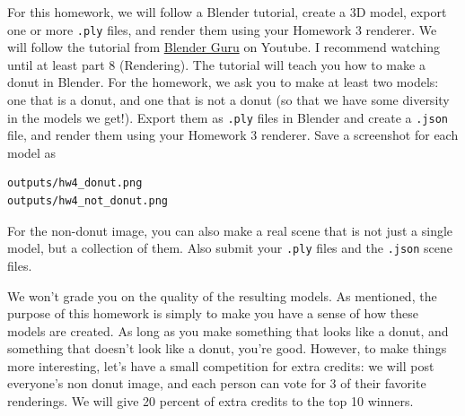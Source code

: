 For this homework, we will follow a Blender tutorial, create a 3D model, export one or more \lstinline{.ply} files, and render them using your Homework 3 renderer. We will follow the tutorial from \href{https://www.youtube.com/playlist?list=PLjEaoINr3zgEPv5y--4MKpciLaoQYZB1Z}{Blender Guru} on Youtube. I recommend watching until at least part 8 (Rendering). The tutorial will teach you how to make a donut in Blender. For the homework, we ask you to make at least two models: one that is a donut, and one that is not a donut (so that we have some diversity in the models we get!). Export them as \lstinline{.ply} files in Blender and create a \lstinline{.json} file, and render them using your Homework 3 renderer. Save a screenshot for each model as
\begin{lstlisting}[language=bash]
outputs/hw4_donut.png
outputs/hw4_not_donut.png
\end{lstlisting}
For the non-donut image, you can also make a real scene that is not just a single model, but a collection of them. Also submit your \lstinline{.ply} files and the \lstinline{.json} scene files.

We won't grade you on the quality of the resulting models. As mentioned, the purpose of this homework is simply to make you have a sense of how these models are created. As long as you make something that looks like a donut, and something that doesn't look like a donut, you're good. However, to make things more interesting, let's have a small competition for extra credits: we will post everyone's non donut image, and each person can vote for 3 of their favorite renderings. We will give 20 percent of extra credits to the top 10 winners.

